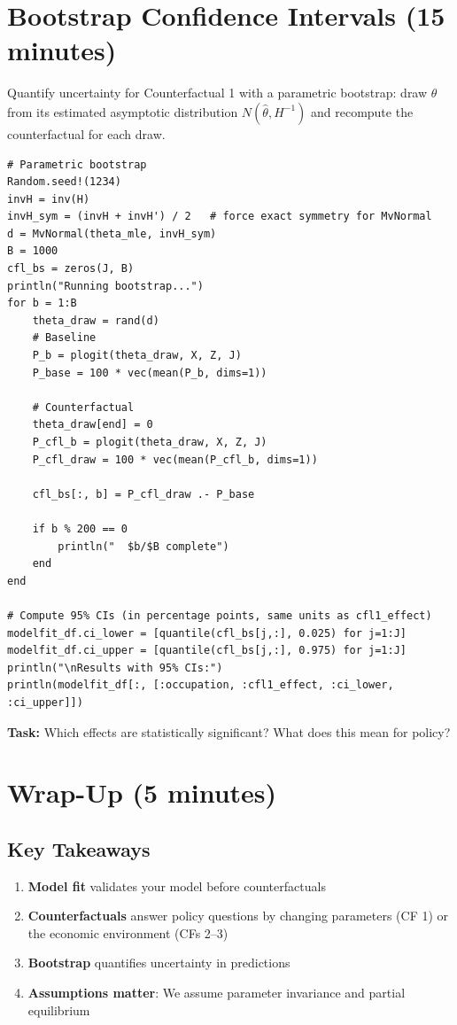 \documentclass[12pt,english]{article}
\begin{document}
\section{Bootstrap Confidence Intervals (15 minutes)}
Quantify uncertainty for Counterfactual 1 with a parametric bootstrap: draw $\theta$ from its estimated asymptotic distribution $N(\hat{\theta}, H^{-1})$ and recompute the counterfactual for each draw.
\begin{verbatim}
# Parametric bootstrap
Random.seed!(1234)
invH = inv(H)
invH_sym = (invH + invH') / 2   # force exact symmetry for MvNormal
d = MvNormal(theta_mle, invH_sym)
B = 1000
cfl_bs = zeros(J, B)
println("Running bootstrap...")
for b = 1:B
    theta_draw = rand(d)
    # Baseline
    P_b = plogit(theta_draw, X, Z, J)
    P_base = 100 * vec(mean(P_b, dims=1))

    # Counterfactual
    theta_draw[end] = 0
    P_cfl_b = plogit(theta_draw, X, Z, J)
    P_cfl_draw = 100 * vec(mean(P_cfl_b, dims=1))

    cfl_bs[:, b] = P_cfl_draw .- P_base

    if b % 200 == 0
        println("  $b/$B complete")
    end
end

# Compute 95% CIs (in percentage points, same units as cfl1_effect)
modelfit_df.ci_lower = [quantile(cfl_bs[j,:], 0.025) for j=1:J]
modelfit_df.ci_upper = [quantile(cfl_bs[j,:], 0.975) for j=1:J]
println("\nResults with 95% CIs:")
println(modelfit_df[:, [:occupation, :cfl1_effect, :ci_lower, :ci_upper]])
\end{verbatim}
\textbf{Task:} Which effects are statistically significant? What does this mean for policy?
\section{Wrap-Up (5 minutes)}
\subsection{Key Takeaways}
\begin{enumerate}
\item \textbf{Model fit} validates your model before counterfactuals
\item \textbf{Counterfactuals} answer policy questions by changing parameters (CF 1) or the economic environment (CFs 2--3)
\item \textbf{Bootstrap} quantifies uncertainty in predictions
\item \textbf{Assumptions matter}: We assume parameter invariance and partial equilibrium
\end{enumerate}
\end{document}
